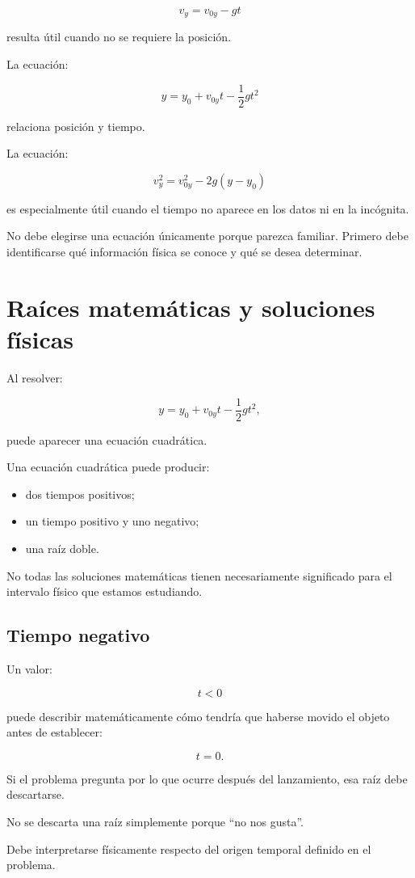 \[
v_y=v_{0y}-gt
\]

resulta útil cuando no se requiere la posición.

La ecuación:

\[
y=y_0+v_{0y}t-\frac{1}{2}gt^2
\]

relaciona posición y tiempo.

La ecuación:

\[
v_y^2=v_{0y}^2-2g(y-y_0)
\]

es especialmente útil cuando el tiempo no aparece en los datos ni en la incógnita.

No debe elegirse una ecuación únicamente porque parezca familiar. Primero debe identificarse qué información física se conoce y qué se desea determinar.


\section{Raíces matemáticas y soluciones físicas}

Al resolver:

\[ y=y_0+v_{0y}t-\frac{1}{2}gt^2, \]

puede aparecer una ecuación cuadrática.

Una ecuación cuadrática puede producir:

\begin{itemize}
    \item dos tiempos positivos;
    \item un tiempo positivo y uno negativo;
    \item una raíz doble.
\end{itemize}

No todas las soluciones matemáticas tienen necesariamente significado para el intervalo físico que estamos estudiando.


\subsection{Tiempo negativo}

Un valor:

\[ t<0 \]

puede describir matemáticamente cómo tendría que haberse movido el objeto antes de establecer:

\[ t=0. \]

Si el problema pregunta por lo que ocurre después del lanzamiento, esa raíz debe descartarse.

\begin{advertencia}
No se descarta una raíz simplemente porque ``no nos gusta''.

Debe interpretarse físicamente respecto del origen temporal definido en el problema.
\end{advertencia}


